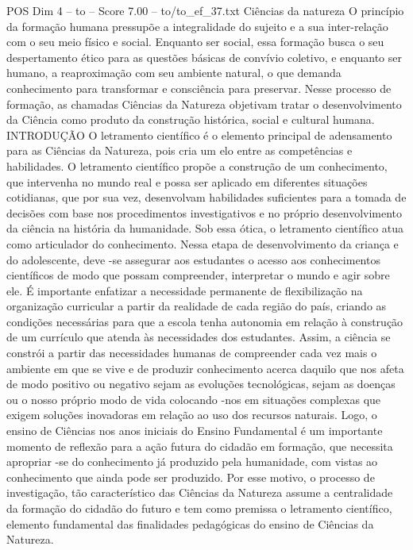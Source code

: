 \begin{textsample}{POS Dim 4 – to – Score 7.00 – to/to\_ef\_37.txt}  \label{ex:f4_pos_210}
Ciências da natureza O princípio da formação humana pressupõe a integralidade do sujeito e a sua inter-relação com o seu meio físico e social.
Enquanto ser social, essa formação busca o seu despertamento ético para as questões básicas de convívio coletivo, e enquanto ser humano, a reaproximação com seu ambiente natural, o que demanda conhecimento para transformar e consciência para preservar.
Nesse processo de formação, as chamadas Ciências da Natureza objetivam tratar o desenvolvimento da Ciência como produto da construção histórica, social e cultural humana.
INTRODUÇÃO O letramento científico é o elemento principal de adensamento para as Ciências da Natureza, pois cria um elo entre as competências e habilidades.
O letramento científico propõe a construção de um conhecimento, que intervenha no mundo real e possa ser aplicado em diferentes situações cotidianas, que por sua vez, desenvolvam habilidades suficientes para a tomada de decisões com base nos procedimentos investigativos e no próprio desenvolvimento da ciência na história da humanidade.
Sob essa ótica, o letramento científico atua como articulador do conhecimento.
Nessa etapa de desenvolvimento da criança e do adolescente, deve -se assegurar aos estudantes o acesso aos conhecimentos científicos de modo que possam compreender, interpretar o mundo e agir sobre ele.
É importante enfatizar a necessidade permanente de flexibilização na organização curricular a partir da realidade de cada região do país, criando as condições necessárias para que a escola tenha autonomia em relação à construção de um currículo que atenda às necessidades dos estudantes.
Assim, a ciência se constrói a partir das necessidades humanas de compreender cada vez mais o ambiente em que se vive e de produzir conhecimento acerca daquilo que nos afeta de modo positivo ou negativo sejam as evoluções tecnológicas, sejam as doenças ou o nosso próprio modo de vida colocando -nos em situações complexas que exigem soluções inovadoras em relação ao uso dos recursos naturais.
Logo, o ensino de Ciências nos anos iniciais do Ensino Fundamental é um importante momento de reflexão para a ação futura do cidadão em formação, que necessita apropriar -se do conhecimento já produzido pela humanidade, com vistas ao conhecimento que ainda pode ser produzido.
Por esse motivo, o processo de investigação, tão característico das Ciências da Natureza assume a centralidade da formação do cidadão do futuro e tem como premissa o letramento científico, elemento fundamental das finalidades pedagógicas do ensino de Ciências da Natureza.

\end{textsample}
